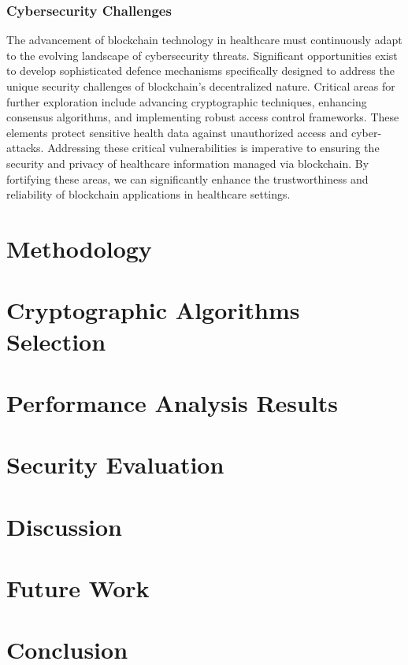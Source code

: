 \documentclass[cic,tc,english]{iiufrgs}
\begin{document}
        \subsection{Cybersecurity Challenges} 
            The advancement of blockchain technology in healthcare must continuously adapt to the evolving landscape of cybersecurity threats. Significant opportunities exist to develop sophisticated defence mechanisms specifically designed to address the unique security challenges of blockchain's decentralized nature. Critical areas for further exploration include advancing cryptographic techniques, enhancing consensus algorithms, and implementing robust access control frameworks. These elements protect sensitive health data against unauthorized access and cyber-attacks. Addressing these critical vulnerabilities is imperative to ensuring the security and privacy of healthcare information managed via blockchain. By fortifying these areas, we can significantly enhance the trustworthiness and reliability of blockchain applications in healthcare settings.


\chapter{Methodology}


\chapter{Cryptographic Algorithms Selection}


\chapter{Performance Analysis Results}


\chapter{Security Evaluation}


\chapter{Discussion}


\chapter{Future Work}


\chapter{Conclusion}
\end{document}
